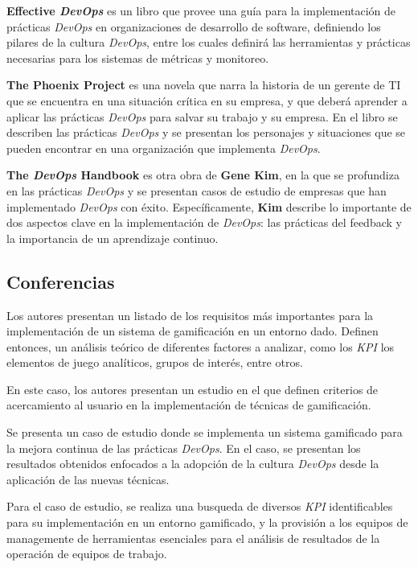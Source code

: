 \documentclass[journal]{IEEEtran}
\begin{document}
\cite{davis2016effective} \textbf{Effective \textit{DevOps}} es un libro que provee una guía para la implementación de prácticas \textit{DevOps} en organizaciones de desarrollo de software, definiendo los pilares de la cultura \textit{DevOps}, entre los cuales definirá las herramientas y prácticas necesarias para los sistemas de métricas y monitoreo.

\cite{kim2018phoenix} \textbf{The Phoenix Project} es una novela que narra la historia de un gerente de TI que se encuentra en una situación crítica en su empresa, y que deberá aprender a aplicar las prácticas \textit{DevOps} para salvar su trabajo y su empresa. En el libro se describen las prácticas \textit{DevOps} y se presentan los personajes y situaciones que se pueden encontrar en una organización que implementa \textit{DevOps}.

\cite{kim2021devops} \textbf{The \textit{DevOps} Handbook} es otra obra de \textbf{Gene Kim}, en la que se profundiza en las prácticas \textit{DevOps} y se presentan casos de estudio de empresas que han implementado \textit{DevOps} con éxito. Específicamente, \textbf{Kim} describe lo importante de dos aspectos clave en la implementación de \textit{DevOps}: las prácticas del feedback y la importancia de un aprendizaje continuo.

\subsection{\textbf{ \textbf{\large Conferencias}}}

\cite{heilbrunn2014towards} Los autores presentan un listado de los requisitos más importantes para la implementación de un sistema de gamificación en un entorno dado. Definen entonces, un análisis teórico de diferentes factores a analizar, como los \textit{KPI} los elementos de juego analíticos, grupos de interés, entre otros.

\cite{meng2014gamification} En este caso, los autores presentan un estudio en el que definen criterios de acercamiento al usuario en la implementación de técnicas de gamificación.

\cite{ayoup2022achievement} Se presenta un caso de estudio donde se implementa un sistema gamificado para la mejora continua de las prácticas \textit{DevOps}. En el caso, se presentan los resultados obtenidos enfocados a la adopción de la cultura \textit{DevOps} desde la aplicación de las nuevas técnicas.

\cite{palenvcarova2022goal} Para el caso de estudio, se realiza una busqueda de diversos \textit{KPI} identificables para su implementación en un entorno gamificado, y la provisión a los equipos de managemente de herramientas esenciales para el análisis de resultados de la operación de equipos de trabajo.
\end{document}
